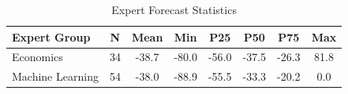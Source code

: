 \begin{table}[tbp]
\centering
\label{tab:expert_forecasts}
\begin{tabular}{lccccccc}
\toprule
Expert Group & N & Mean & Min & P25 & P50 & P75 & Max \\
\midrule
Economics & 34 & -38.7 & -80.0 & -56.0 & -37.5 & -26.3 & 81.8 \\
Machine Learning & 54 & -38.0 & -88.9 & -55.5 & -33.3 & -20.2 & 0.0 \\
\bottomrule
\end{tabular}
\vspace{1em}
\caption{Expert Forecast Statistics}
\end{table}
